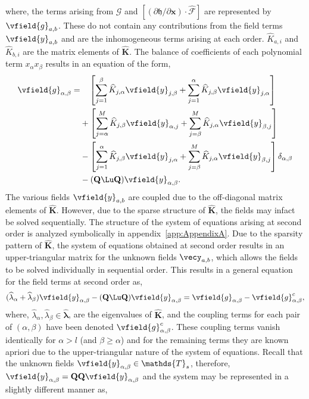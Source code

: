 where, the terms arising from $\mathcal{G}$ and $[(\partial \mathfrak{h}/\partial \mathbf{x})\cdot \mathcal{\widehat{F}}]$ are represented by $\vfield{g}_{a,b}$. These do not contain any contributions from the field terms $\vfield{y}_{a,b}$ and are the inhomogeneous terms arising at each order.  $\widehat{K}_{a,i}$ and $\widehat{K}_{b,i}$ are the matrix elements of $\mathbf{\widehat{K}}$. The balance of coefficients of each polynomial term $x_{\alpha}x_{\beta}$ results in an equation of the form,
\begin{align}
	\label{eqn:second_order_alpha_beta_terms}
	\begin{split}
		 \vfield{g}_{\alpha,\beta} =& \ \ \ \left[\sum_{j=1}^{\beta}\widehat{K}_{j,\alpha}\vfield{y}_{j,\beta} + \sum_{j=1}^{\alpha}\widehat{K}_{j,\beta}\vfield{y}_{j,\alpha} \right] \\
		& + \left[\sum_{j=\alpha}^{M}\widehat{K}_{j,\beta}\vfield{y}_{\alpha,j} + \sum_{j=\beta}^{M}\widehat{K}_{j,\alpha}\vfield{y}_{\beta,j} \right] \\
		& - \left[\sum_{j=1}^{\alpha}\widehat{K}_{j,\beta}\vfield{y}_{j,\alpha} + \sum_{j=\beta}^{M}\widehat{K}_{j,\alpha}\vfield{y}_{\beta,j} \right]\delta_{\alpha,\beta} \\
		& - (\mathbf{Q}\Lu\mathbf{Q})\vfield{y}_{\alpha,\beta}.
	\end{split}
\end{align}
The various fields $\vfield{y}_{a,b}$ are coupled due to the off-diagonal matrix elements of $\mathbf{\widehat{K}}$. However, due to the sparse structure of $\mathbf{\widehat{K}}$, the fields may infact be solved sequentially. The structure of the system of equations arising at second order is analyzed symbolically in appendix~\ref{app:AppendixA}. Due to the sparsity pattern of $\mathbf{\widehat{K}}$, the system of equations obtained at second order results in an upper-triangular matrix for the unknown fields $\vecy_{a,b}$, which allows the fields to be solved individually in sequential order. This results in a general equation for the field terms at second order as,
\begin{align}
	(\widehat{\lambda}_{\alpha} + \widehat{\lambda}_{\beta})\vfield{y}_{\alpha,\beta} 
	- (\mathbf{Q}\Lu\mathbf{Q})\vfield{y}_{\alpha,\beta} = \vfield{g}_{\alpha,\beta} - \vfield{g}^{c}_{\alpha,\beta}, \nonumber
\end{align}
where, $\widehat{\lambda}_{\alpha},\widehat{\lambda}_{\beta} \in \widehat{\boldsymbol{\lambda}}$, are the eigenvalues of $\mathbf{\widehat{K}}$, and the coupling terms for each pair of $(\alpha,\beta)$ have been denoted $\vfield{g}^{c}_{\alpha,\beta}$. These coupling terms vanish identically for $\alpha > l $ (and $\beta\ge\alpha$) and for the remaining terms they are known apriori due to the upper-triangular nature of the system of equations. Recall that the unknown fields $\vfield{y}_{\alpha,\beta}\in\mathds{T}_{s}$, therefore, $\vfield{y}_{\alpha,\beta} = \mathbf{Q}\mathbf{Q}\vfield{y}_{\alpha,\beta}$ and the system may be represented in a slightly different manner as, 
